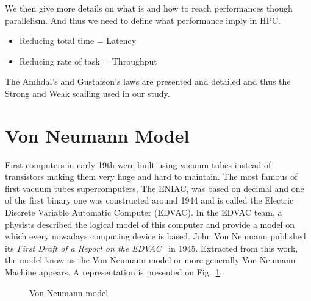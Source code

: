 We then give more details on what is and how to reach performances though parallelism. 
And thus we need to define what performance imply in HPC. 
\begin{itemize}
\item Reducing total time = Latency 
\item Reducing rate of task = Throughput 
\end{itemize}

The Amhdal's and Gustafson's laws are presented and detailed and thus the Strong and Weak scailing used in our study. 

\section{Von Neumann Model}

First computers in early 19th were built using vacuum tubes instead of transistors making them very huge and hard to maintain. 
The most famous of first vacuum tubes supercomputers, The ENIAC, was based on decimal and one of the first binary one was constructed around 1944 and is called the Electric Discrete Variable Automatic Computer (EDVAC). 
In the EDVAC team, a physists described the logical model of this computer and provide a model on which every nowadays computing device is based. 
John Von Neumann published its \textit{First Draft of a Report on the EDVAC}~\cite{von1993first} in 1945. 
Extracted from this work, the model know as the Von Neumann model or more generally Von Neumann Machine appears. 
A representation is presented on Fig.~\ref{fig:1_HPC:von_neumann_model}.

\begin{figure}
\centering 
{}
\caption{Von Neumann model}
\label{fig:1_HPC:von_neumann_model}
\end{figure}

